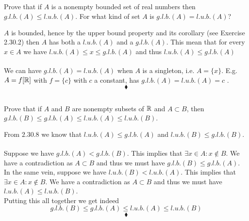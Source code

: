 \subsection{}
\begin{tcolorbox}

Prove that if $A$ is a nonempty bounded set of real numbers then $g.l.b. (A) \leq l.u.b. (A)$. For what kind of set $A$ is $g.l.b. (A) =l.u.b. (A)$? 
\end{tcolorbox}
$A$ is bounded, hence by the upper bound property and its corollary (see Exercise 2.30.2) then $A$ has both a $l.u.b.(A)$  and a $g.l.b.(A)$. This mean that for every $x\in A$ we have $l.u.b.(A)\leq x\leq g.l.b.(A)$ and thus $l.u.b.(A)\leq g.l.b.(A)$\\\\
We can have $g.l.b. (A) =l.u.b. (A)$ when $A$ is a singleton, i.e. $A=\{x\}$. E.g. $A=f[\mathbb{R}]$ with $f=\{c\}$ with $c$ a constant, has $g.l.b. (A) =l.u.b. (A)=c$ .
$$\blacklozenge$$



\subsection{}
\begin{tcolorbox}
Prove that if $A$ and $B$ are nonempty subsets of $\mathbb{R}$ and $A \subset B$, then $g.l.b. (B) \leq g.l.b. (A)\leq  l.u.b. (A) \leq l.u.b. (B)$. 
\end{tcolorbox}
From $\mathbf{2.30.8}$ we know that $l.u.b.(A)\leq g.l.b.(A)$ and $l.u.b.(B)\leq g.l.b.(B)$. \\\\
Suppose we have $g.l.b.(A)< g.l.b.(B)$. This implies that $\exists x\in A: x\not \in B$. We have a contradiction as $A\subset B$ and thus we must have $g.l.b.(B)\leq g.l.b.(A)$.\\
In the same vein, suppose we have $l.u.b.(B)< l.u.b.(A)$. This implies that $\exists x\in A: x\not \in B$. We have a contradiction as $A\subset B$ and thus we must have $l.u.b.(A)\leq l.u.b.(B)$. \\
Putting this all together we get indeed
$$g.l.b. (B) \leq g.l.b. (A)\leq  l.u.b. (A) \leq l.u.b. (B)$$
$$\blacklozenge$$
\newpage

